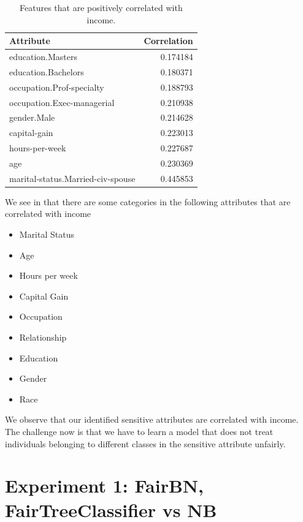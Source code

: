\begin{table}
    \centering
    \begin{tabular}{lr}
        \toprule
        Attribute &  Correlation \\
        \midrule
        education.Masters                 &     0.174184 \\
        education.Bachelors               &     0.180371 \\
        occupation.Prof-specialty         &     0.188793 \\
        occupation.Exec-managerial        &     0.210938 \\
        gender.Male                       &     0.214628 \\
        capital-gain                      &     0.223013 \\
        hours-per-week                    &     0.227687 \\
        age                               &     0.230369 \\
        marital-status.Married-civ-spouse &     0.445853 \\
        \bottomrule
    \end{tabular}
    \caption{Features that are positively correlated with income.}
    \label{fig:positive_income_correaltion}
\end{table}

We see  in that there are some categories in the following attributes that are correlated with income

\begin{itemize}
    \item Marital Status
    \item Age
    \item Hours per week
    \item Capital Gain
    \item Occupation
    \item Relationship
    \item Education
    \item Gender
    \item Race
\end{itemize}

We observe that our identified sensitive attributes are correlated with income. The challenge now is that we have to learn a model that does not treat individuals belonging to different classes in the sensitive attribute unfairly.

\section{Experiment 1: FairBN, FairTreeClassifier vs NB}
\label{sec:result:experiment1}

